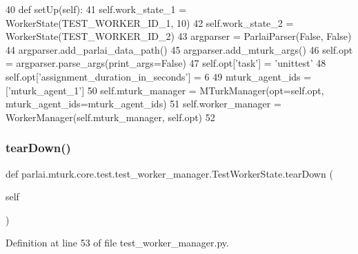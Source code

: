 \begin{DoxyCode}
40     \textcolor{keyword}{def }setUp(self):
41         self.work\_state\_1 = WorkerState(TEST\_WORKER\_ID\_1, 10)
42         self.work\_state\_2 = WorkerState(TEST\_WORKER\_ID\_2)
43         argparser = ParlaiParser(\textcolor{keyword}{False}, \textcolor{keyword}{False})
44         argparser.add\_parlai\_data\_path()
45         argparser.add\_mturk\_args()
46         self.opt = argparser.parse\_args(print\_args=\textcolor{keyword}{False})
47         self.opt[\textcolor{stringliteral}{'task'}] = \textcolor{stringliteral}{'unittest'}
48         self.opt[\textcolor{stringliteral}{'assignment\_duration\_in\_seconds'}] = 6
49         mturk\_agent\_ids = [\textcolor{stringliteral}{'mturk\_agent\_1'}]
50         self.mturk\_manager = MTurkManager(opt=self.opt, mturk\_agent\_ids=mturk\_agent\_ids)
51         self.worker\_manager = WorkerManager(self.mturk\_manager, self.opt)
52 
\end{DoxyCode}
\mbox{\label{classparlai_1_1mturk_1_1core_1_1test_1_1test__worker__manager_1_1TestWorkerState_ad3684725733a84ad658c4f93e1b35d98}} 
\subsubsection{\texorpdfstring{tear\+Down()}{tearDown()}}
{\footnotesize\ttfamily def parlai.\+mturk.\+core.\+test.\+test\+\_\+worker\+\_\+manager.\+Test\+Worker\+State.\+tear\+Down (\begin{DoxyParamCaption}\item[{}]{self }\end{DoxyParamCaption})}



Definition at line 53 of file test\+\_\+worker\+\_\+manager.\+py.


